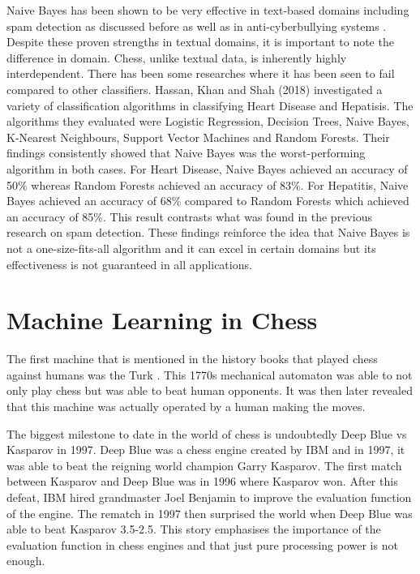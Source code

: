 Naive Bayes has been shown to be very effective in text-based domains including spam detection as discussed before as well as in anti-cyberbullying systems \cite{igeAIPoweredAntiCyber2022}. Despite these proven strengths in textual domains, it is important to note the difference in domain. Chess, unlike textual data, is inherently highly interdependent. There has been some researches where it has been seen to fail compared to other classifiers. Hassan, Khan and Shah (2018) \cite{ulhassanComparisonMachineLearning2018} investigated a variety of classification algorithms in classifying Heart Disease and Hepatisis. The algorithms they evaluated were Logistic Regression, Decision Trees, Naive Bayes, K-Nearest Neighbours, Support Vector Machines and Random Forests. Their findings consistently showed that Naive Bayes was the worst-performing algorithm in both cases. For Heart Disease, Naive Bayes achieved an accuracy of 50\% whereas Random Forests achieved an accuracy of 83\%. For Hepatitis, Naive Bayes achieved an accuracy of 68\% compared to Random Forests which achieved an accuracy of 85\%. This result contrasts what was found in the previous research on spam detection. These findings reinforce the idea that Naive Bayes is not a one-size-fits-all algorithm and it can excel in certain domains but its effectiveness is not guaranteed in all applications. 

\section{Machine Learning in Chess}

The first machine that is mentioned in the history books that played chess against humans was the Turk \cite{stephensMechanicalTurkShort2023}. This 1770s mechanical automaton was able to not only play chess but was able to beat human opponents. It was then later revealed that this machine was actually operated by a human making the moves. 

The biggest milestone to date in the world of chess is undoubtedly Deep Blue vs Kasparov in 1997. Deep Blue was a chess engine created by IBM and in 1997, it was able to beat the reigning world champion Garry Kasparov. The first match between Kasparov and Deep Blue was in 1996 where Kasparov won. After this defeat, IBM hired grandmaster Joel Benjamin to improve the evaluation function of the engine. The rematch in 1997 then surprised the world when Deep Blue was able to beat Kasparov 3.5-2.5. This story emphasises the importance of the evaluation function in chess engines and that just pure processing power is not enough. 

